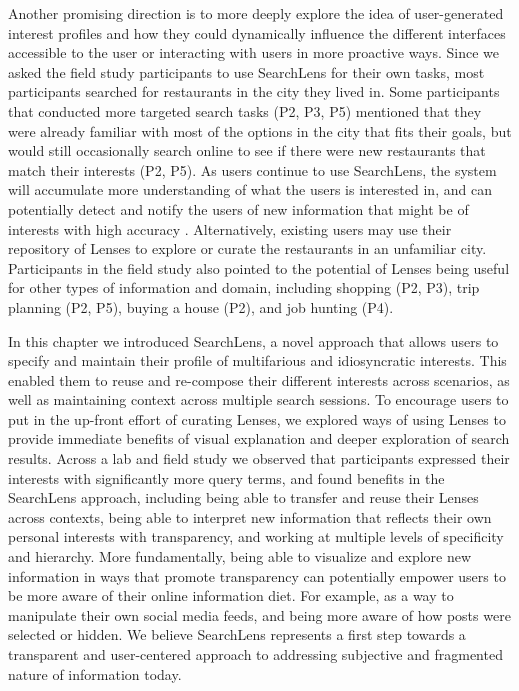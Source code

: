 Another promising direction is to more deeply explore the idea of user-generated interest profiles and how they could dynamically influence the different interfaces accessible to the user or interacting with users in more proactive ways.
Since we asked the field study participants to use SearchLens for their own tasks, most participants searched for restaurants in the city they lived in. Some participants that conducted more targeted search tasks (P2, P3, P5) mentioned that they were already familiar with most of the options in the city that fits their goals, but would still occasionally search online to see if there were new restaurants that match their interests (P2, P5).
As users continue to use SearchLens, the system will accumulate more understanding of what the users is interested in, and can potentially detect and notify the users of new information that might be of interests with high accuracy \cite{yang2006retroactive}.
Alternatively, existing users may use their repository of Lenses to explore or curate the restaurants in an unfamiliar city. Participants in the field study also pointed to the potential of Lenses being useful for other types of information and domain, including shopping (P2, P3), trip planning (P2, P5), buying a house (P2), and job hunting (P4). 


In this chapter we introduced SearchLens, a novel approach that allows users to specify and maintain their profile of multifarious and idiosyncratic interests. This enabled them to reuse and re-compose their different interests across scenarios, as well as maintaining context across multiple search sessions. To encourage users to put in the up-front effort of curating Lenses, we explored ways of using Lenses to provide immediate benefits of visual explanation and deeper exploration of search results. Across a lab and field study we observed that participants expressed their interests with significantly more query terms, and found benefits in the SearchLens approach, including being able to transfer and reuse their Lenses across contexts, being able to interpret new information that reflects their own personal interests with transparency, and working at multiple levels of specificity and hierarchy.
More fundamentally, being able to visualize and explore new information in ways that promote transparency can potentially empower users to be more aware of their online information diet. For example, as a way to manipulate their own social media feeds, and being more aware of how posts were selected or hidden. We believe SearchLens represents a first step towards a transparent and user-centered approach to addressing subjective and fragmented nature of information today.




